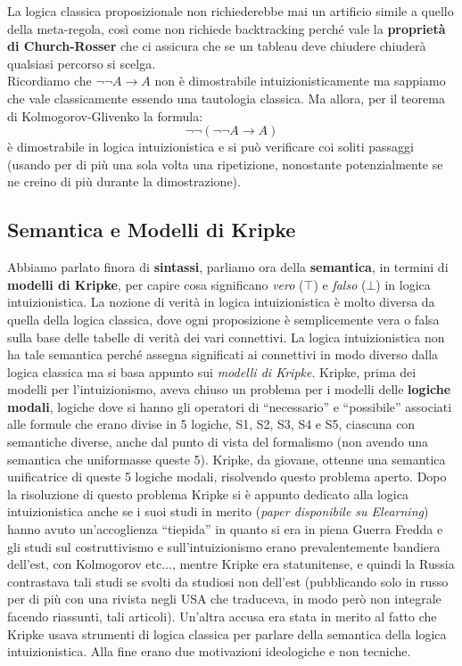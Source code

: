 \documentclass[a4paper,12pt, oneside]{book}
\begin{document}
La logica classica proposizionale non richiederebbe mai un artificio simile a
quello della meta-regola, così come non richiede backtracking perché vale la
\textbf{proprietà di Church-Rosser} che ci assicura che se un tableau deve
chiudere chiuderà qualsiasi percorso si scelga.\\
Ricordiamo che $\neg\neg A\to A$ non è dimostrabile intuizionisticamente ma
sappiamo che vale classicamente essendo una tautologia classica. Ma allora, per
il teorema di Kolmogorov-Glivenko la formula:
\[\neg\neg(\neg\neg A\to A)\]
è dimostrabile in logica intuizionistica e si può verificare coi soliti
passaggi (usando per di più una sola volta una ripetizione, nonostante
potenzialmente se ne creino di più durante la dimostrazione).
\subsection{Semantica e Modelli di Kripke}
Abbiamo parlato finora di \textbf{sintassi}, parliamo ora della
\textbf{semantica}, in termini di \textbf{modelli di Kripke}, per capire cosa
significano \textit{vero} ($\top$) e \textit{falso} ($\bot$) in logica
intuizionistica. La nozione di verità in logica intuizionistica è molto diversa
da quella della logica classica, dove ogni proposizione è semplicemente vera o
falsa sulla base delle tabelle di verità dei vari connettivi. La logica
intuizionistica non ha tale semantica perché assegna significati ai connettivi
in modo diverso dalla logica classica ma si basa appunto sui \textit{modelli di
  Kripke}. Kripke, prima dei modelli per l'intuizionismo, aveva chiuso un
problema per i modelli delle \textbf{logiche modali}, logiche dove si hanno gli
operatori di ``necessario'' e ``possibile'' associati alle formule che erano
divise in 5 logiche, S1, S2, S3, S4 e S5, ciascuna con semantiche diverse, anche
dal punto di vista del formalismo (non avendo una semantica che uniformasse
queste 5). Kripke, da giovane, ottenne una semantica unificatrice di queste 5
logiche modali, risolvendo questo problema aperto. Dopo la risoluzione di questo
problema Kripke si è appunto dedicato alla logica intuizionistica anche se i
suoi studi in merito (\textit{paper disponibile su Elearning}) hanno avuto
un'accoglienza ``tiepida'' in quanto si era in piena Guerra Fredda e gli studi
sul costruttivismo e sull'intuizionismo erano prevalentemente bandiera dell'est,
con Kolmogorov etc$\ldots$, mentre Kripke era statunitense, e quindi la Russia
contrastava tali studi se svolti da studiosi non dell'est (pubblicando solo in
russo per di più con una rivista negli USA che traduceva, in modo però non
integrale facendo riassunti, tali articoli). Un'altra accusa era
stata in merito al fatto che Kripke usava strumenti di logica classica per
parlare della semantica della logica intuizionistica. Alla fine erano due
motivazioni ideologiche e non tecniche.
\end{document}
